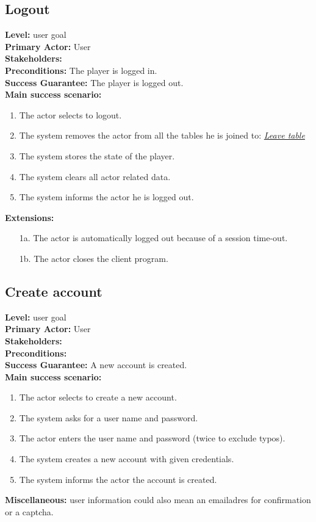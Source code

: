 \documentclass[a4paper,11pt]{report}
\begin{document}
\subsection{Logout}
\textbf{Level:} user goal \\
\textbf{Primary Actor:} User \\
\textbf{Stakeholders:} \\
\textbf{Preconditions:} The player is logged in. \\
\textbf{Success Guarantee:} The player is logged out.\\
\textbf{Main success scenario:} 
\begin{enumerate}
\item The actor selects to logout. 
\item The system removes the actor from all the tables he is joined to: \emph{\underline{Leave table}}
\item The system stores the state of the player.
\item The system clears all actor related data. 
\item The system informs the actor he is logged out. 
\end{enumerate}
\textbf{Extensions:}
\begin{itemize}
\item[1a.] The actor is automatically logged out because of a session time-out. 
\item[1b.] The actor closes the client program.
\end{itemize}

\subsection{Create account}
\textbf{Level:} user goal \\
\textbf{Primary Actor:} User \\
\textbf{Stakeholders:} \\
\textbf{Preconditions:} \\
\textbf{Success Guarantee:} A new account is created. \\
\textbf{Main success scenario:} 
\begin{enumerate}
\item The actor selects to create a new account. 
\item The system asks for a user name and password.
\item The actor enters the user name and password (twice to exclude typos).
\item The system creates a new account with given credentials. 
\item The system informs the actor the account is created.
\end{enumerate}
\textbf{Miscellaneous:} user information could also mean an emailadres for confirmation or a captcha.
\end{document}
